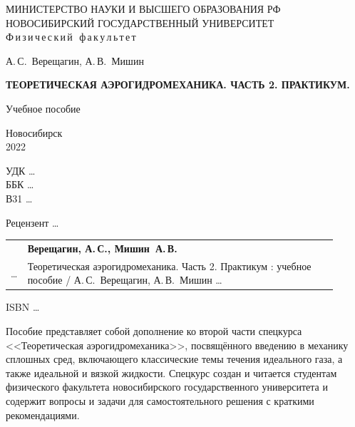 \documentclass[a4paper, 14pt]{extarticle}
\begin{document}
\begin{titlepage}
	\pagestyle{empty}




	\centering	
	\footnotesize
	МИНИСТЕРСТВО НАУКИ И ВЫСШЕГО ОБРАЗОВАНИЯ РФ\\
	НОВОСИБИРСКИЙ ГОСУДАРСТВЕННЫЙ УНИВЕРСИТЕТ\\
	Ф\,и\,з\,и\,ч\,е\,с\,к\,и\,й\, \,ф\,а\,к\,у\,л\,ь\,т\,е\,т	
	
	
	\small
	\bigskip
	\bigskip
	\bigskip
	\bigskip
	
	А.\,С.~Верещагин, А.\,В.~Мишин
	\bigskip
	
	\textbf{ТЕОРЕТИЧЕСКАЯ АЭРОГИДРОМЕХАНИКА. ЧАСТЬ 2. ПРАКТИКУМ.}
	\bigskip
	
	Учебное пособие	
	
	\vfill	
	Новосибирск\\
	2022\\


\end{titlepage}


\footnotesize

\noindent УДК \ldots \\%
\noindent ББК \ldots \\%
\noindent В31 \ldots \\%


\begin{center}
	\centering
	Рецензент \ldots\\
\end{center}


\noindent
\begin{tabular}{p{0.01\linewidth}p{0.90\linewidth}}
	& 	\textbf{Верещагин, А.\,С., Мишин~А.\,В.}\\
	\ldots %
	& 
	Теоретическая аэрогидромеханика. Часть 2. Практикум : учебное пособие / А.\,С. Верещагин, А.\,В.~Мишин \ldots %
\end{tabular}

\medskip
ISBN  \ldots%

\medskip
Пособие представляет собой дополнение ко второй части спецкурса <<Теоретическая аэрогидромеханика>>, посвящённого введению в механику сплошных сред, включающего классические темы течения идеального газа, а также идеальной и вязкой жидкости. Спецкурс создан и читается   студентам физического факультета новосибирского государственного университета и содержит вопросы и задачи для самостоятельного решения с краткими рекомендациями.  
\end{document}
